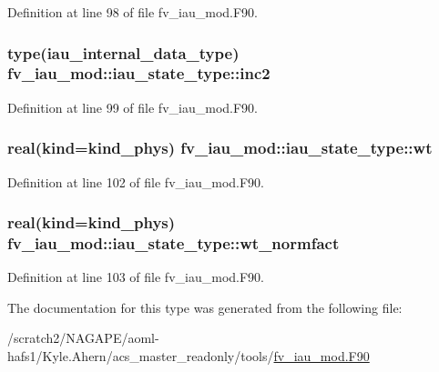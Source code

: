 Definition at line 98 of file fv\-\_\-iau\-\_\-mod.\-F90.

\subsubsection[{inc2}]{\setlength{\rightskip}{0pt plus 5cm}type({\bf iau\-\_\-internal\-\_\-data\-\_\-type}) fv\-\_\-iau\-\_\-mod\-::iau\-\_\-state\-\_\-type\-::inc2\hspace{0.3cm}{\ttfamily [private]}}\label{structfv__iau__mod_1_1iau__state__type_a2969126d74a69d2e7657439ed109ce7b}


Definition at line 99 of file fv\-\_\-iau\-\_\-mod.\-F90.

\subsubsection[{wt}]{\setlength{\rightskip}{0pt plus 5cm}real(kind=kind\-\_\-phys) fv\-\_\-iau\-\_\-mod\-::iau\-\_\-state\-\_\-type\-::wt\hspace{0.3cm}{\ttfamily [private]}}\label{structfv__iau__mod_1_1iau__state__type_aae6b10a1f01da751413176dc4196e695}


Definition at line 102 of file fv\-\_\-iau\-\_\-mod.\-F90.

\subsubsection[{wt\-\_\-normfact}]{\setlength{\rightskip}{0pt plus 5cm}real(kind=kind\-\_\-phys) fv\-\_\-iau\-\_\-mod\-::iau\-\_\-state\-\_\-type\-::wt\-\_\-normfact\hspace{0.3cm}{\ttfamily [private]}}\label{structfv__iau__mod_1_1iau__state__type_a04f738f0d6fbb3e64e44fc94421bf48d}


Definition at line 103 of file fv\-\_\-iau\-\_\-mod.\-F90.



The documentation for this type was generated from the following file\-:\begin{DoxyCompactItemize}
\item 
/scratch2/\-N\-A\-G\-A\-P\-E/aoml-\/hafs1/\-Kyle.\-Ahern/acs\-\_\-master\-\_\-readonly/tools/\hyperlink{fv__iau__mod_8F90}{fv\-\_\-iau\-\_\-mod.\-F90}\end{DoxyCompactItemize}

